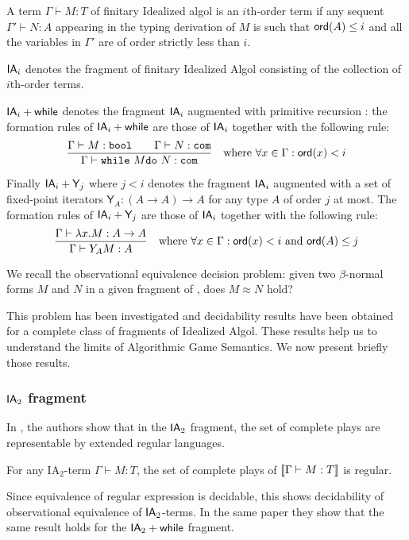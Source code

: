 \begin{dfn}
A term $\Gamma \vdash M:T$ of finitary Idealized algol is an $i$th-order term if any sequent $\Gamma' \vdash N:A$ appearing
in the typing derivation of $M$ is such that ${\sf ord}(A) \leq i$ and all the variables in $\Gamma'$ are of order strictly less than $i$.
\end{dfn}

$\textsf{IA}_i$ denotes the fragment of finitary Idealized Algol
consisting of the collection of $i$th-order terms.

$\textsf{IA}_i + \textsf{while}$ denotes the fragment $\textsf{IA}_i$ augmented with
primitive recursion : the formation rules of $\textsf{IA}_i + \textsf{while}$  are those
of $\textsf{IA}_i$ together with the following rule:
$$  \frac{\displaystyle \Gamma \vdash M : \texttt{bool} \qquad \Gamma \vdash N : \texttt{com}}{\Gamma \vdash \texttt{while}\ M \texttt{do}\ N : \texttt{com} } \quad \mbox{where } \forall x \in \Gamma : {\sf ord}(x) < i $$

Finally $\textsf{IA}_i + \textsf{Y}_j$ where $j
< i$ denotes the fragment $\textsf{IA}_i$ augmented with a set of
fixed-point iterators $\textsf{Y}_A : (A\rightarrow A ) \rightarrow
A$ for any type $A$ of order $j$ at most. The formation rules of $\textsf{IA}_i + \textsf{Y}_j$  are those
of $\textsf{IA}_i$ together with the following rule:
$$  \frac{\displaystyle \Gamma \vdash \lambda x . M : A\rightarrow A}{\Gamma \vdash Y_A M : A} \quad \mbox{where } \forall x \in \Gamma : {\sf ord}(x) < i
                                                                            \mbox{ and } {\sf ord}(A) \leq j $$

We recall the observational equivalence decision problem: given two
$\beta$-normal forms $M$ and $N$ in a given fragment of \ialgol,
does $M \approx N$ hold?

This problem has been investigated and decidability results have
been obtained for a complete class of fragments of Idealized Algol.
These results help us to understand the limits of Algorithmic Game
Semantics. We now present briefly those results.

\subsubsection{$\textsf{IA}_2$ fragment}
In \cite{ghicamccusker00}, the authors show that in the $\textsf{IA}_2$ fragment,
the set of complete plays are representable by extended regular languages.

\begin{lem}
For any IA$_2$-term $\Gamma \vdash M : T$, the set of complete
plays of ${[\![ \Gamma \vdash M : T ]\!]}$ is regular.
\end{lem}
Since equivalence of regular expression is decidable, this shows
decidability of observational equivalence of $\textsf{IA}_2$-terms. In
the same paper they show that the same result holds for the
$\textsf{IA}_2 +\textsf{while}$ fragment.

